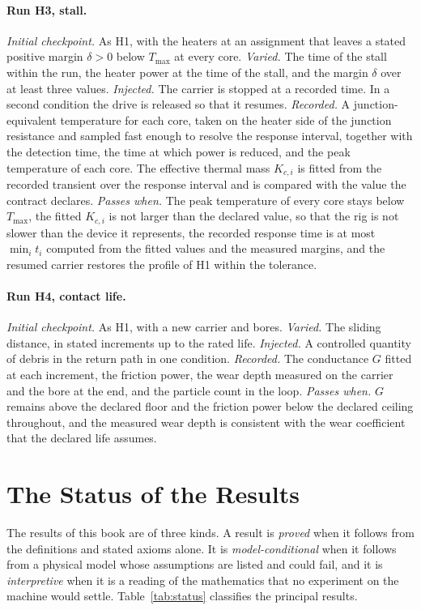 \documentclass[11pt,openany]{book}
\theoremstyle{plain}
\theoremstyle{definition}
\theoremstyle{remark}
\begin{document}
\paragraph{Run H3, stall.} \emph{Initial checkpoint.} As H1, with the heaters at an assignment that leaves a stated positive margin $\delta>0$ below $T_{\max}$ at every core. \emph{Varied.} The time of the stall within the run, the heater power at the time of the stall, and the margin $\delta$ over at least three values. \emph{Injected.} The carrier is stopped at a recorded time. In a second condition the drive is released so that it resumes. \emph{Recorded.} A junction-equivalent temperature for each core, taken on the heater side of the junction resistance and sampled fast enough to resolve the response interval, together with the detection time, the time at which power is reduced, and the peak temperature of each core. The effective thermal mass $K_{c,i}$ is fitted from the recorded transient over the response interval and is compared with the value the contract declares. \emph{Passes when.} The peak temperature of every core stays below $T_{\max}$, the fitted $K_{c,i}$ is not larger than the declared value, so that the rig is not slower than the device it represents, the recorded response time is at most $\min_it_i$ computed from the fitted values and the measured margins, and the resumed carrier restores the profile of H1 within the tolerance.

\paragraph{Run H4, contact life.} \emph{Initial checkpoint.} As H1, with a new carrier and bores. \emph{Varied.} The sliding distance, in stated increments up to the rated life. \emph{Injected.} A controlled quantity of debris in the return path in one condition. \emph{Recorded.} The conductance $G$ fitted at each increment, the friction power, the wear depth measured on the carrier and the bore at the end, and the particle count in the loop. \emph{Passes when.} $G$ remains above the declared floor and the friction power below the declared ceiling throughout, and the measured wear depth is consistent with the wear coefficient that the declared life assumes.

\section{The Status of the Results}

The results of this book are of three kinds. A result is \emph{proved} when it follows from the definitions and stated axioms alone. It is \emph{model-conditional} when it follows from a physical model whose assumptions are listed and could fail, and it is \emph{interpretive} when it is a reading of the mathematics that no experiment on the machine would settle. Table~\ref{tab:status} classifies the principal results.
\end{document}
